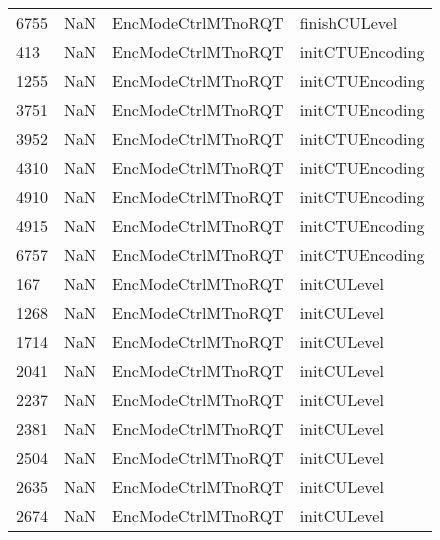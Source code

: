 \begin{tabular}{llll}
6755 &                   NaN &         EncModeCtrlMTnoRQT &                             finishCULevel \\
413  &                   NaN &         EncModeCtrlMTnoRQT &                           initCTUEncoding \\
1255 &                   NaN &         EncModeCtrlMTnoRQT &                           initCTUEncoding \\
3751 &                   NaN &         EncModeCtrlMTnoRQT &                           initCTUEncoding \\
3952 &                   NaN &         EncModeCtrlMTnoRQT &                           initCTUEncoding \\
4310 &                   NaN &         EncModeCtrlMTnoRQT &                           initCTUEncoding \\
4910 &                   NaN &         EncModeCtrlMTnoRQT &                           initCTUEncoding \\
4915 &                   NaN &         EncModeCtrlMTnoRQT &                           initCTUEncoding \\
6757 &                   NaN &         EncModeCtrlMTnoRQT &                           initCTUEncoding \\
167  &                   NaN &         EncModeCtrlMTnoRQT &                               initCULevel \\
1268 &                   NaN &         EncModeCtrlMTnoRQT &                               initCULevel \\
1714 &                   NaN &         EncModeCtrlMTnoRQT &                               initCULevel \\
2041 &                   NaN &         EncModeCtrlMTnoRQT &                               initCULevel \\
2237 &                   NaN &         EncModeCtrlMTnoRQT &                               initCULevel \\
2381 &                   NaN &         EncModeCtrlMTnoRQT &                               initCULevel \\
2504 &                   NaN &         EncModeCtrlMTnoRQT &                               initCULevel \\
2635 &                   NaN &         EncModeCtrlMTnoRQT &                               initCULevel \\
2674 &                   NaN &         EncModeCtrlMTnoRQT &                               initCULevel \\

\end{tabular}
